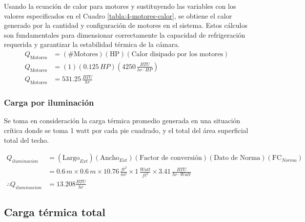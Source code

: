 Usando la ecuación de calor para motores y sustituyendo las variables con los valores especificados en el Cuadro \ref{tabla:4-motores-calor}, se obtiene el calor generado por la cantidad y configuración de motores en el sistema. Estos cálculos son fundamentales para dimensionar correctamente la capacidad de refrigeración requerida y garantizar la estabilidad térmica de la cámara.
 	\begin{equation}
 		\begin{aligned}
 			Q_{\text{Motores}} &= (\#\text{Motores}) (\text{HP}) (\text{Calor disipado por los motores}) \\
 			Q_{\text{Motores}} &= (1)(0.125 \,  {HP}) \left( 4250 \, \frac{ {BTU}}{ {hr} \cdot  {HP}} \right) \\
 			Q_{\text{Motores}} &= 531.25 \, \frac{ {BTU}}{ {hr}} 
 			\label{eq:calor-motor}
 		\end{aligned}
 	\end{equation}
 	
 	\subsubsection{Carga por iluminación}
 	Se toma en consideración la carga térmica promedio generada en una situación crítica
 	donde se toma 1 watt por cada pie cuadrado, y el total del área superficial total del techo.
 	
 	\begin{equation}
 		\begin{aligned}
 			Q_{iluminacion} &= (\text{Largo}_{Ext})(\text{Ancho}_{Ext})(\text{Factor de conversión})(\text{Dato de Norma})(\text{FC}_{Norma}) \\
 			&= 0.6\, m \times 0.6\, m \times 10.76\, \frac{ft^2}{m^2} \times 1\, \frac{Watt}{ft^2} \times 3.41\, \frac{BTU}{hr \cdot Watt} \\
 		\therefore Q_{iluminacion} &=  13.208 \frac{BTU}{hr}
 		\end{aligned}
 	\end{equation}
 	 \subsection{Carga térmica total}
 	
